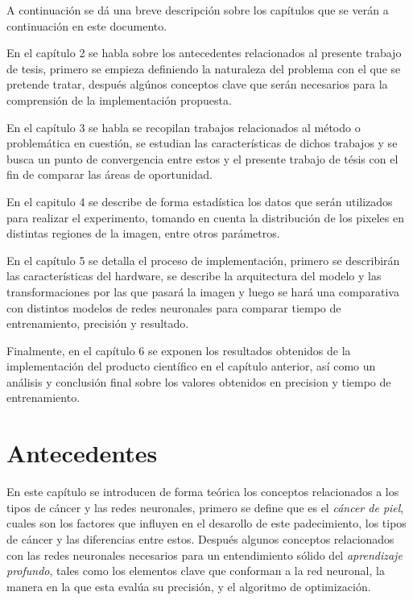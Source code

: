 A continuación se dá una breve descripción sobre los capítulos que se verán a continuación en este documento.

En el capítulo 2 se habla sobre los antecedentes relacionados al presente trabajo de tesis, primero se empieza definiendo la naturaleza del problema con el que se pretende tratar, después algúnos conceptos clave que serán necesarios para la comprensión de la implementación propuesta. 

En el capítulo 3 se habla se recopilan trabajos relacionados al método o problemática en cuestión, se estudian las características de dichos trabajos y se busca un punto de convergencia entre estos y el presente trabajo de tésis con el fin de comparar las áreas de oportunidad.

En el capitulo 4 se describe de forma estadística los datos que serán utilizados para realizar el experimento, tomando en cuenta la distribución de los pixeles en distintas regiones de la imagen, entre otros parámetros. 

En el capítulo 5 se detalla el proceso de implementación, primero se describirán las características del hardware, se describe la arquitectura del modelo y las transformaciones por las que pasará la imagen y luego se hará una comparativa con distintos modelos de redes neuronales para comparar tiempo de entrenamiento, precisión y resultado.

Finalmente, en el capítulo 6 se exponen los resultados obtenidos de la implementación del producto científico en el capítulo anterior, así como un análisis y conclusión final sobre los valores obtenidos en precision y tiempo de entrenamiento. 

\chapter{Antecedentes}
En este capítulo se introducen de forma teórica los conceptos relacionados a los tipos de cáncer y las redes neuronales, primero se define que es el \emph{cáncer de piel}, cuales son los factores que influyen en el desarollo de este padecimiento, los tipos de cáncer y las diferencias entre estos. Después algunos conceptos relacionados con las redes neuronales necesarios para un entendimiento sólido del \emph{aprendizaje profundo}, tales como los elementos clave que conforman a la red neuronal, la manera en la que esta evalúa su precisión, y el algoritmo de optimización.

